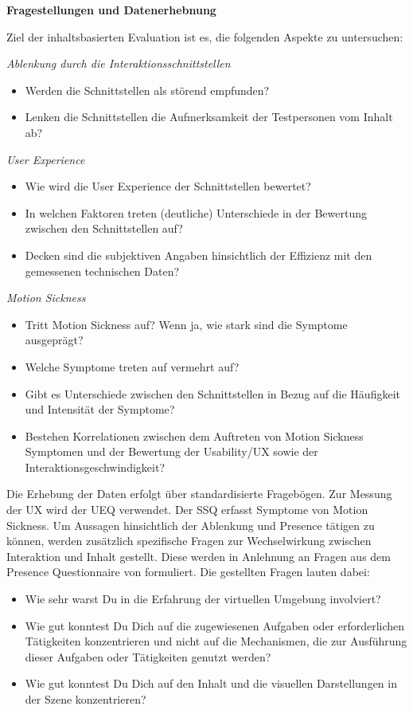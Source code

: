\textbf{Fragestellungen und Datenerhebnung}

Ziel der inhaltsbasierten Evaluation ist es, die folgenden Aspekte zu untersuchen:

\textit{Ablenkung durch die Interaktionsschnittstellen}
\begin{itemize}
    \item Werden die Schnittstellen als störend empfunden?
    \item Lenken die Schnittstellen die Aufmerksamkeit der Testpersonen vom Inhalt ab?
\end{itemize}
\textit{User Experience}
\begin{itemize}
    \item Wie wird die User Experience der Schnittstellen bewertet?
    \item In welchen Faktoren treten (deutliche) Unterschiede in der Bewertung zwischen den Schnittstellen auf? 
    \item Decken sind die subjektiven Angaben hinsichtlich der Effizienz mit den gemessenen technischen Daten?
\end{itemize}
\textit{Motion Sickness}
\begin{itemize}
    \item Tritt Motion Sickness auf? Wenn ja, wie stark sind die Symptome ausgeprägt?
    \item Welche Symptome treten auf vermehrt auf?
    \item Gibt es Unterschiede zwischen den Schnittstellen in Bezug auf die Häufigkeit und Intensität der Symptome?
    \item Bestehen Korrelationen zwischen dem Auftreten von Motion Sickness Symptomen und der Bewertung der Usability/UX sowie der Interaktionsgeschwindigkeit? 
\end{itemize}

Die Erhebung der Daten erfolgt über standardisierte Fragebögen. Zur Messung der UX wird der UEQ verwendet. Der SSQ erfasst Symptome von Motion Sickness. Um Aussagen hinsichtlich der Ablenkung und Presence tätigen zu können, werden zusätzlich spezifische Fragen zur Wechselwirkung zwischen Interaktion und Inhalt gestellt. Diese werden in Anlehnung an Fragen aus dem Presence Questionnaire von \citet{witmer_measuring_1998} formuliert. Die gestellten Fragen lauten dabei:

\begin{itemize}
    \item Wie sehr warst Du in die Erfahrung der virtuellen Umgebung involviert?
    \item Wie gut konntest Du Dich auf die zugewiesenen Aufgaben oder erforderlichen Tätigkeiten konzentrieren und nicht auf die Mechanismen, die zur Ausführung dieser Aufgaben oder Tätigkeiten genutzt werden?
    \item Wie gut konntest Du Dich auf den Inhalt und die visuellen Darstellungen in der Szene konzentrieren?
\end{itemize}

